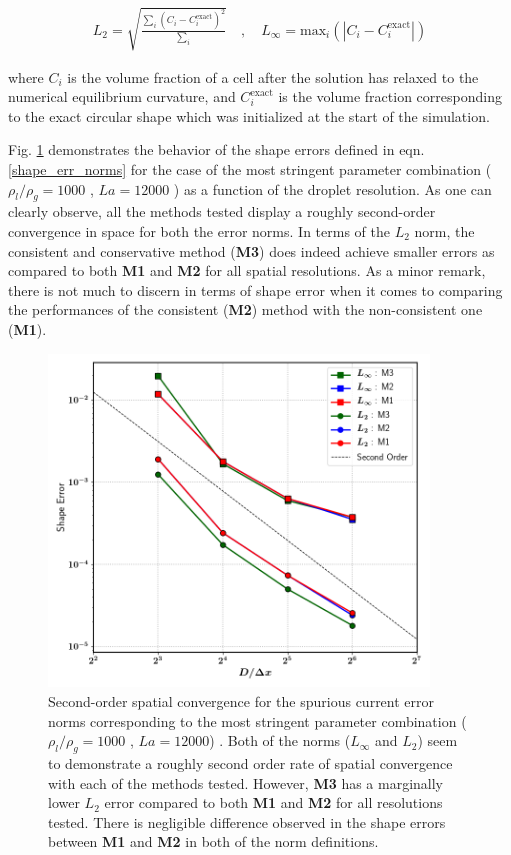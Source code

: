 \begin{align}
	L_2 = \sqrt{\frac{\sum_i \left(C_i - C_i^\text{exact} \right)^2}{\sum_i}} \quad , \quad L_\infty = \text{max}_i \left( | C_i - C_i^\text{exact} | \right)
  \label{shape_err_norms}
\end{align}

where $C_i$ is the volume fraction of a cell after the solution has relaxed to the numerical equilibrium curvature, and $C_i^\text{exact}$ is the volume fraction corresponding to the exact circular shape which was initialized at the start of the simulation.  

Fig. \ref{static_drop_conv} demonstrates the behavior of the shape errors defined in eqn. \ref{shape_err_norms} for the case of the most stringent parameter combination ( $\rho_l / \rho_g = 1000 $ , $La = 12000$ ) as a function of the droplet resolution. As one can clearly observe, all the methods tested display a roughly second-order convergence in space for both the error norms. In terms of the $L_2$ norm, the consistent and conservative method (\textbf{M3}) does indeed achieve smaller errors as compared to both \textbf{M1} and \textbf{M2} for all spatial resolutions. As a minor remark, there is not much to discern in terms of shape error when it comes to comparing the performances of the consistent (\textbf{M2}) method with the non-consistent one (\textbf{M1}). 

\begin{figure}[h!]
    \centering
    \includegraphics[width = 0.9\textwidth]{plots/static_drop/static_drop_convergence.png}
	\caption{Second-order spatial convergence for the spurious current error norms corresponding to the most stringent parameter combination ($\rho_l/\rho_g = 1000$ , $La = 12000$) . Both of the norms ($L_\infty$ and $L_2$) seem to demonstrate a roughly second order rate of spatial convergence with each of the methods tested. However, \textbf{M3} has a marginally lower $L_2$ error compared to both \textbf{M1} and \textbf{M2} for all resolutions tested. There is negligible difference observed in the shape errors between \textbf{M1} and \textbf{M2} in both of the norm definitions.}   
    \label{static_drop_conv}
\end{figure}


